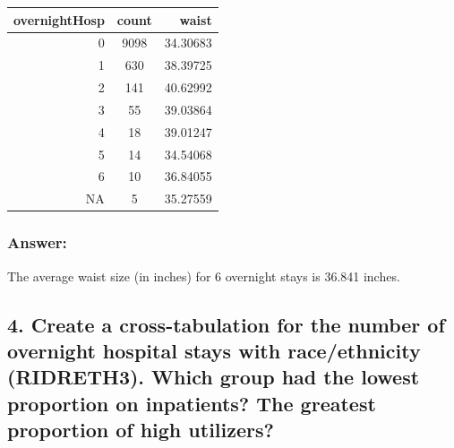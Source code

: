 \documentclass[]{article}
\newenvironment{Shaded}{\begin{snugshade}}{\end{snugshade}}
\newcommand{\CommentTok}[1]{\textcolor[rgb]{0.56,0.35,0.01}{\textit{#1}}}
\newcommand{\DataTypeTok}[1]{\textcolor[rgb]{0.13,0.29,0.53}{#1}}
\newcommand{\DecValTok}[1]{\textcolor[rgb]{0.00,0.00,0.81}{#1}}
\newcommand{\KeywordTok}[1]{\textcolor[rgb]{0.13,0.29,0.53}{\textbf{#1}}}
\newcommand{\NormalTok}[1]{#1}
\newcommand{\OperatorTok}[1]{\textcolor[rgb]{0.81,0.36,0.00}{\textbf{#1}}}
\newcommand{\StringTok}[1]{\textcolor[rgb]{0.31,0.60,0.02}{#1}}
\begin{document}
\captionsetup[table]{labelformat=empty,skip=1pt}
\begin{longtable}{rcr}
\toprule
overnightHosp & count & waist \\ 
\midrule
0 & 9098 & 34.30683 \\ 
1 & 630 & 38.39725 \\ 
2 & 141 & 40.62992 \\ 
3 & 55 & 39.03864 \\ 
4 & 18 & 39.01247 \\ 
5 & 14 & 34.54068 \\ 
6 & 10 & 36.84055 \\ 
NA & 5 & 35.27559 \\ 
\bottomrule
\end{longtable}

\hypertarget{answer-2}{%
\subsubsection{Answer:}\label{answer-2}}

The average waist size (in inches) for 6 overnight stays is 36.841
inches.

\hypertarget{create-a-cross-tabulation-for-the-number-of-overnight-hospital-stays-with-raceethnicity-ridreth3.-which-group-had-the-lowest-proportion-on-inpatients-the-greatest-proportion-of-high-utilizers}{%
\subsection{4. Create a cross-tabulation for the number of overnight
hospital stays with race/ethnicity (RIDRETH3). Which group had the
lowest proportion on inpatients? The greatest proportion of high
utilizers?}\label{create-a-cross-tabulation-for-the-number-of-overnight-hospital-stays-with-raceethnicity-ridreth3.-which-group-had-the-lowest-proportion-on-inpatients-the-greatest-proportion-of-high-utilizers}}

\begin{Shaded}
\end{Shaded}
\end{document}
